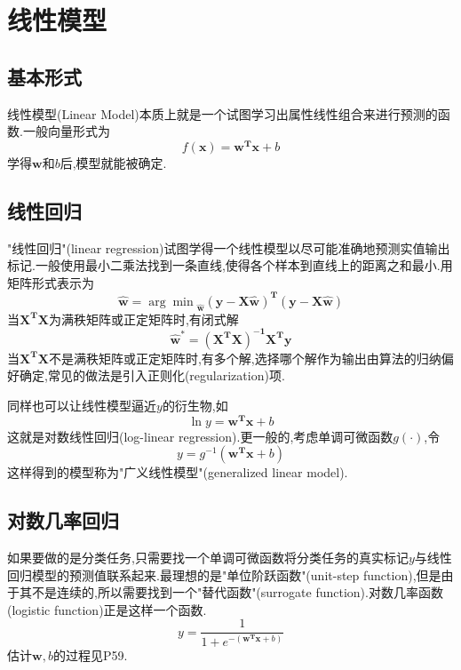 \chapter{线性模型}

\section{基本形式}

线性模型(Linear Model)本质上就是一个试图学习出属性线性组合来进行预测的函数.一般向量形式为
\begin{equation}
f(\mathbf x)=\mathbf{w^Tx}+b
\end{equation}
学得$\mathbf w$和$b$后,模型就能被确定.

\section{线性回归}

"线性回归"(linear regression)试图学得一个线性模型以尽可能准确地预测实值输出标记.一般使用最小二乘法找到一条直线,使得各个样本到直线上的距离之和最小.用矩阵形式表示为
\begin{equation}
\mathbf{\hat w}={\arg\min}_{\mathbf{\hat w}}\mathbf{(y-X\hat w)^T(y-X\hat w)}
\end{equation}
当$\mathbf{X^TX}$为满秩矩阵或正定矩阵时,有闭式解
\begin{equation}
\mathbf{\hat w}^\ast=\mathbf{(X^TX)^{-1}X^Ty}
\end{equation}
当$\mathbf{X^TX}$不是满秩矩阵或正定矩阵时,有多个解,选择哪个解作为输出由算法的归纳偏好确定,常见的做法是引入正则化(regularization)项.

同样也可以让线性模型逼近$y$的衍生物,如
\begin{equation}
\ln y=\mathbf{w^Tx}+b
\end{equation}
这就是对数线性回归(log-linear regression).更一般的,考虑单调可微函数$g(\cdot)$,令
\begin{equation}
y=g^{-1}(\mathbf{w^Tx}+b)
\end{equation}
这样得到的模型称为"广义线性模型"(generalized linear model).

\section{对数几率回归}

如果要做的是分类任务,只需要找一个单调可微函数将分类任务的真实标记$y$与线性回归模型的预测值联系起来.最理想的是"单位阶跃函数"(unit-step function),但是由于其不是连续的,所以需要找到一个"替代函数"(surrogate function).对数几率函数(logistic function)正是这样一个函数.
\begin{equation}
y=\frac{1}{1+e^{-(\mathbf{w^Tx}+b)}}
\end{equation}
估计$\mathbf w,b$的过程见P59.

